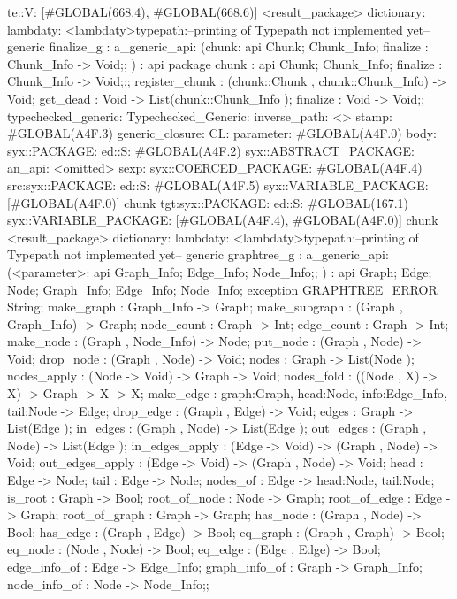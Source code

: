                      te::V:
                     [#GLOBAL(668.4), #GLOBAL(668.6)]
         <result_package>
dictionary:
lambdaty:
  <lambdaty>typepath:--printing of Typepath not implemented yet--
generic finalize_g
:
a_generic_api:
(chunk:
api {
    Chunk;
    Chunk_Info;
    finalize : Chunk_Info -> Void;};
)
:
api {   package chunk
          : api {
                Chunk;
                Chunk_Info;
                finalize : Chunk_Info -> Void;};;
    register_chunk : (chunk::Chunk , chunk::Chunk_Info) -> Void;
    get_dead : Void -> List(chunk::Chunk_Info );
    finalize : Void -> Void;};
typechecked_generic:
Typechecked_Generic:
inverse_path: <>
stamp: #GLOBAL(A4F.3)
generic_closure:
CL:
parameter: #GLOBAL(A4F.0)
body: syx::PACKAGE:
        ed::S: #GLOBAL(A4F.2)
            syx::ABSTRACT_PACKAGE:
                an_api: <omitted>
                sexp:
                    syx::COERCED_PACKAGE:
                        #GLOBAL(A4F.4)
                         src:syx::PACKAGE:
                         ed::S: #GLOBAL(A4F.5) syx::VARIABLE_PACKAGE: [#GLOBAL(A4F.0)] chunk
                        tgt:syx::PACKAGE:
                         ed::S: #GLOBAL(167.1) syx::VARIABLE_PACKAGE: [#GLOBAL(A4F.4), #GLOBAL(A4F.0)] chunk
         <result_package>
dictionary:
lambdaty:
  <lambdaty>typepath:--printing of Typepath not implemented yet--
generic graphtree_g
:
a_generic_api:
(<parameter>:
api {
    Graph_Info;
    Edge_Info;
    Node_Info;};
)
:
api {
    Graph;
    Edge;
    Node;
    Graph_Info;
    Edge_Info;
    Node_Info;
    exception GRAPHTREE_ERROR String;
    make_graph : Graph_Info -> Graph;
    make_subgraph : (Graph , Graph_Info) -> Graph;
    node_count : Graph -> Int;
    edge_count : Graph -> Int;
    make_node : (Graph , Node_Info) -> Node;
    put_node : (Graph , Node) -> Void;
    drop_node : (Graph , Node) -> Void;
    nodes : Graph -> List(Node );
    nodes_apply : (Node -> Void) -> Graph -> Void;
    nodes_fold : ((Node , X) -> X) -> Graph -> X -> X;
    make_edge : {graph:Graph, head:Node, info:Edge_Info, tail:Node} -> Edge;
    drop_edge : (Graph , Edge) -> Void;
    edges : Graph -> List(Edge );
    in_edges : (Graph , Node) -> List(Edge );
    out_edges : (Graph , Node) -> List(Edge );
    in_edges_apply : (Edge -> Void) -> (Graph , Node) -> Void;
    out_edges_apply : (Edge -> Void) -> (Graph , Node) -> Void;
    head : Edge -> Node;
    tail : Edge -> Node;
    nodes_of : Edge -> {head:Node, tail:Node};
    is_root : Graph -> Bool;
    root_of_node : Node -> Graph;
    root_of_edge : Edge -> Graph;
    root_of_graph : Graph -> Graph;
    has_node : (Graph , Node) -> Bool;
    has_edge : (Graph , Edge) -> Bool;
    eq_graph : (Graph , Graph) -> Bool;
    eq_node : (Node , Node) -> Bool;
    eq_edge : (Edge , Edge) -> Bool;
    edge_info_of : Edge -> Edge_Info;
    graph_info_of : Graph -> Graph_Info;
    node_info_of : Node -> Node_Info;};
